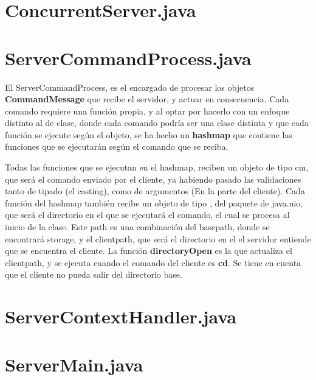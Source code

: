 \documentclass[a4paper, 12pt]{report}
\begin{document}
    \section{ConcurrentServer.java}
    \section{ServerCommandProcess.java}
    El ServerCommandProcess, es el encargado de procesar los objetos \textbf{CommandMessage} que recibe el
    servidor, y actuar en consecuencia. Cada comando requiere una función propia, y al optar
    por hacerlo con un enfoque distinto al de clase, donde cada comando podría ser una clase distinta y que cada
    función se ejecute según el objeto, se ha hecho un \textbf{hashmap} que contiene las funciones que se ejecutarán
    según el comando que se reciba.

    Todas las funciones que se ejecutan en el hashmap, reciben un objeto de tipo cm,
    que será el comando enviado por el cliente, ya habiendo pasado las validaciones tanto de tipado (el casting),
    como de argumentos (En la parte del cliente). Cada función del hashmap también recibe un objeto de tipo
    , del paquete de java.nio, que será el directorio en el que se ejecutará el comando, el cual se
    procesa al inicio de la clase. Este path es una combinación del basepath, donde se encontrará storage, y el
    clientpath, que será el directorio en el el servidor entiende que se encuentra el cliente. La función
    \textbf{directoryOpen} es la que actualiza el clientpath, y se ejecuta cuando el comando del cliente es
    \textbf{cd}. Se tiene en cuenta que el cliente no pueda salir del directorio base.

    \section{ServerContextHandler.java}
    \section{ServerMain.java}
\end{document}
